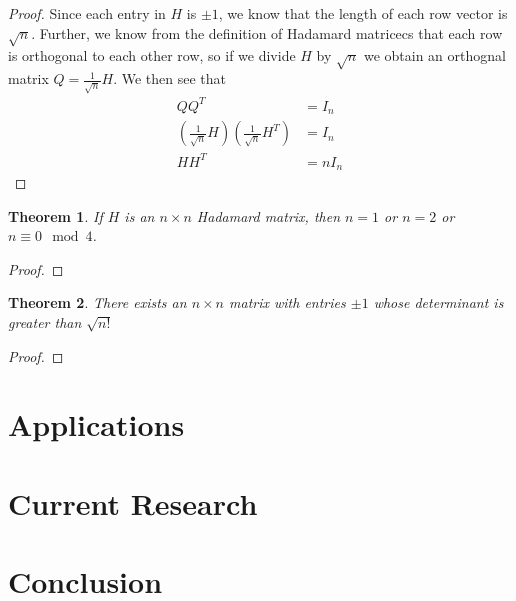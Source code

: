 \documentclass{article}
\newtheorem{theorem}{Theorem}[section]
\theoremstyle{definition}
\begin{document}
\begin{proof}
Since each entry in $H$ is $\pm 1$, we know that the length of each row vector is $\sqrt{n}$. Further, we know from the definition of Hadamard matricecs that each row is orthogonal to each other row, so if we divide $H$ by $\sqrt n$ we obtain an orthognal matrix $Q = \frac{1}{\sqrt n} H$. We then see that
\begin{align*}
  QQ^T &= I_n\\
  \left(\frac{1}{\sqrt n} H\right)\left(\frac{1}{\sqrt n} H^T\right) &= I_n\\
  HH^T &= nI_n
\end{align*}
\end{proof}

\begin{theorem}
If $H$ is an $n \times n$ Hadamard matrix, then $n = 1$ or $n = 2$ or $n \equiv 0 \mod 4$.
\end{theorem}

\begin{proof}
\end{proof}

\begin{theorem}
There exists an $n \times n$ matrix with entries $\pm 1$ whose determinant is greater than $\sqrt{n!}$
\end{theorem}

\begin{proof}
\end{proof}
\section{Applications}

\section{Current Research}

\section{Conclusion}
\end{document}

